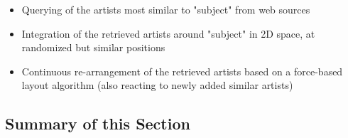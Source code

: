 \begin{itemize}
	\item Querying of the artists most similar to "subject" from web sources
	\item Integration of the retrieved artists around "subject" in 2D space, at randomized but similar positions
	\item Continuous re-arrangement of the retrieved artists based on a force-based layout algorithm (also reacting to newly added similar artists)
\end{itemize}

\subsection{Summary of this Section}